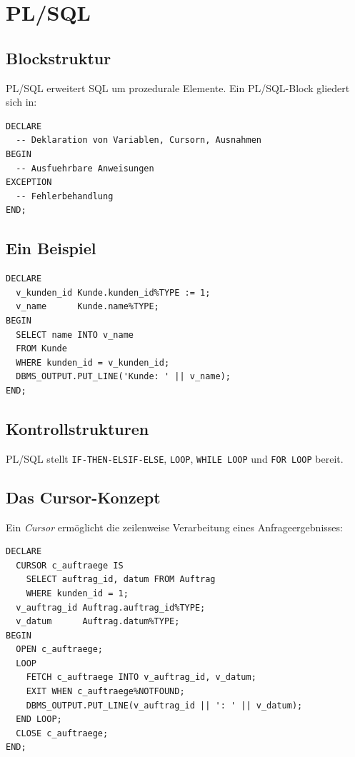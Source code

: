 ﻿\documentclass[a4paper,12pt]{report}
\theoremstyle{definition}
\theoremstyle{remark}
\begin{document}
\chapter{PL/SQL}
\label{ch:plsql}

\section{Blockstruktur}

PL/SQL erweitert SQL um prozedurale Elemente. Ein PL/SQL-Block gliedert
sich in:

\begin{lstlisting}
DECLARE
  -- Deklaration von Variablen, Cursorn, Ausnahmen
BEGIN
  -- Ausfuehrbare Anweisungen
EXCEPTION
  -- Fehlerbehandlung
END;
\end{lstlisting}

\section{Ein Beispiel}

\begin{lstlisting}
DECLARE
  v_kunden_id Kunde.kunden_id%TYPE := 1;
  v_name      Kunde.name%TYPE;
BEGIN
  SELECT name INTO v_name
  FROM Kunde
  WHERE kunden_id = v_kunden_id;
  DBMS_OUTPUT.PUT_LINE('Kunde: ' || v_name);
END;
\end{lstlisting}

\section{Kontrollstrukturen}

PL/SQL stellt \texttt{IF-THEN-ELSIF-ELSE}, \texttt{LOOP},
\texttt{WHILE LOOP} und \texttt{FOR LOOP} bereit.

\section{Das Cursor-Konzept}

Ein \emph{Cursor} ermöglicht die zeilenweise Verarbeitung eines
Anfrageergebnisses:

\begin{lstlisting}
DECLARE
  CURSOR c_auftraege IS
    SELECT auftrag_id, datum FROM Auftrag
    WHERE kunden_id = 1;
  v_auftrag_id Auftrag.auftrag_id%TYPE;
  v_datum      Auftrag.datum%TYPE;
BEGIN
  OPEN c_auftraege;
  LOOP
    FETCH c_auftraege INTO v_auftrag_id, v_datum;
    EXIT WHEN c_auftraege%NOTFOUND;
    DBMS_OUTPUT.PUT_LINE(v_auftrag_id || ': ' || v_datum);
  END LOOP;
  CLOSE c_auftraege;
END;
\end{lstlisting}
\end{document}
